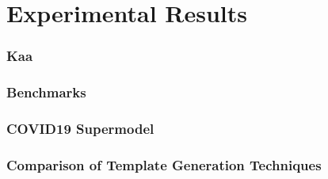 \chapter{Experimental Results}

\subsection{Kaa}
\label{sec:kaa}

\subsection{Benchmarks}
\label{sec:benchmarks}

\subsection{COVID19 Supermodel}
\label{sec:covid}

\subsection{Comparison of Template Generation Techniques}
\label{sec:compare}

